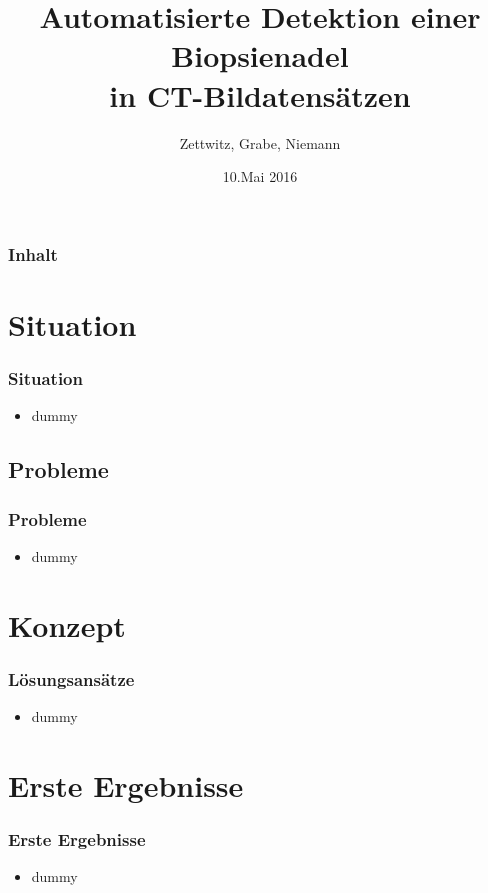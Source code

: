 \documentclass[11pt]{beamer}
\author{Zettwitz, Grabe, Niemann}
\title{Automatisierte Detektion einer Biopsienadel \\ in CT-Bildatensätzen}
\date{10.Mai 2016}
\begin{document}
\begin{frame}
\titlepage
\end{frame}

\begin{frame}
\frametitle{Inhalt} 
\tableofcontents
\end{frame}


\section{Situation}
\begin{frame}
\frametitle{Situation}
\begin{itemize} 
\item dummy
\end{itemize}
\end{frame}


\subsection{Probleme}
\begin{frame}
\frametitle{Probleme}
\begin{itemize}
\item dummy
\end{itemize}
\end{frame}

\section{Konzept}
\begin{frame}
\frametitle{Lösungsansätze}
\begin{itemize}
\item dummy
\end{itemize}
\end{frame}


\section{Erste Ergebnisse}
\begin{frame}
\frametitle{Erste Ergebnisse}
\begin{itemize}
\item dummy
\end{itemize}
\end{frame}
\end{document}
